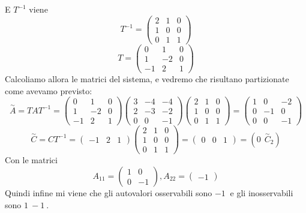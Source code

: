 \documentclass{article}
\begin{document}
E $T^{-1}$ viene \[ 
T^{-1} = \left(\begin{matrix}2 & 1 & 0\\1 & 0 & 0\\0 & 1 & 1\end{matrix}\right) \]
\[ 
T = \left(\begin{matrix}0 & 1 & 0\\1 & -2 & 0\\-1 & 2 & 1\end{matrix}\right) \]Calcoliamo allora le matrici del sistema, e vedremo che risultano partizionate come avevamo previsto:
\[ 
\overset{\sim}{A} = T A  T^{-1} = \left(\begin{matrix}0 & 1 & 0\\1 & -2 & 0\\-1 & 2 & 1\end{matrix}\right)\left(\begin{matrix}3 & -4 & -4\\2 & -3 & -2\\0 & 0 & -1\end{matrix}\right)\left(\begin{matrix}2 & 1 & 0\\1 & 0 & 0\\0 & 1 & 1\end{matrix}\right) = \left(\begin{matrix}1 & 0 & -2\\0 & -1 & 0\\0 & 0 & -1\end{matrix}\right) \]
\[ 
\overset{\sim}{C} = CT^{-1} = \left(\begin{matrix}-1 & 2 & 1\end{matrix}\right)\left(\begin{matrix}2 & 1 & 0\\1 & 0 & 0\\0 & 1 & 1\end{matrix}\right) = \left(\begin{matrix}0 & 0 & 1\end{matrix}\right) = ( 0\ \ \overset{\sim}{C}_2) \]
Con le matrici \[ A_{11} = \left(\begin{matrix}1 & 0\\0 & -1\end{matrix}\right) , A_{22} = \left(\begin{matrix}-1\end{matrix}\right) \]Quindi infine mi viene che gli autovalori osservabili sono $ -1\  $ e gli inosservabili sono $ 1\ -1\  $.
\end{document}
